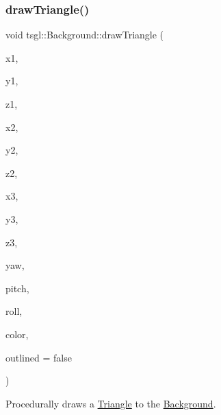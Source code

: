 \subsubsection{\texorpdfstring{draw\+Triangle()}{drawTriangle()}\hspace{0.1cm}{\footnotesize\ttfamily [1/2]}}
{\footnotesize\ttfamily void tsgl\+::\+Background\+::draw\+Triangle (\begin{DoxyParamCaption}\item[{float}]{x1,  }\item[{float}]{y1,  }\item[{float}]{z1,  }\item[{float}]{x2,  }\item[{float}]{y2,  }\item[{float}]{z2,  }\item[{float}]{x3,  }\item[{float}]{y3,  }\item[{float}]{z3,  }\item[{float}]{yaw,  }\item[{float}]{pitch,  }\item[{float}]{roll,  }\item[{\hyperlink{structtsgl_1_1_color_float}{Color\+Float}}]{color,  }\item[{bool}]{outlined = {\ttfamily false} }\end{DoxyParamCaption})\hspace{0.3cm}{\ttfamily [virtual]}}



Procedurally draws a \hyperlink{classtsgl_1_1_triangle}{Triangle} to the \hyperlink{classtsgl_1_1_background}{Background}. 

